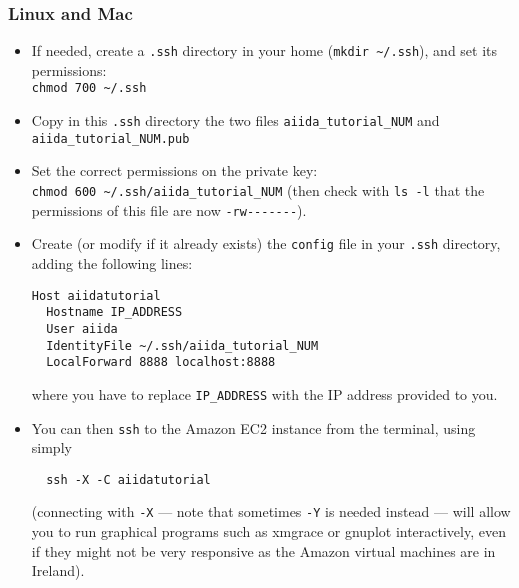 \subsubsection*{Linux and Mac}	
\begin{itemize}
 \item If needed, create a \texttt{.ssh} directory in your home (\verb|mkdir ~/.ssh|), and set its permissions:
   \\ \verb|chmod 700 ~/.ssh|
 \item Copy in this \texttt{.ssh} directory the two files
   \verb|aiida_tutorial_NUM| and\\
   \verb|aiida_tutorial_NUM.pub|
 \item Set the correct permissions on the private key: \\
 \verb|chmod 600 ~/.ssh/aiida_tutorial_NUM| (then check with \verb|ls -l| that the permissions of this file are now \verb|-rw-------|).
 \item Create (or modify if it already exists) the \texttt{config} file in your \texttt{.ssh} directory, adding the following lines:
\begin{verbatim}
Host aiidatutorial
  Hostname IP_ADDRESS
  User aiida
  IdentityFile ~/.ssh/aiida_tutorial_NUM
  LocalForward 8888 localhost:8888
\end{verbatim}
where you have to replace \verb|IP_ADDRESS| with the IP address
provided to you.
 \item You can then \texttt{ssh} to the Amazon EC2 instance from the
   terminal, using simply
 \begin{verbatim}
  ssh -X -C aiidatutorial
 \end{verbatim}
  (connecting with \verb|-X| --- note that sometimes \verb|-Y| is needed
  instead ---
  will allow you to run graphical programs such as xmgrace or
  gnuplot interactively, even if they might not be very responsive as the
  Amazon virtual machines are in Ireland). 
\end{itemize}

